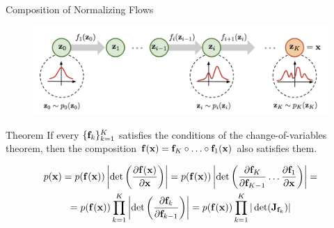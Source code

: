 \documentclass{beamer}
\begin{document}
\begin{frame}{Composition of Normalizing Flows}
	\vspace{-0.3cm}
	\begin{figure}
		\includegraphics[width=0.95\linewidth]{figs/normalizing-flow}
	\end{figure}
	\vspace{-0.3cm}
	\begin{block}{Theorem}
		If every $\{\mathbf{f}_k\}_{k=1}^K$ satisfies the conditions of the change-of-variables theorem, then the composition $\mathbf{f}(\mathbf{x}) = \mathbf{f}_K \circ \ldots \circ \mathbf{f}_1(\mathbf{x})$ also satisfies them.
	\end{block}
	\vspace{-0.3cm}
	{\footnotesize
		\begin{multline*}
			p(\mathbf{x}) = p(\mathbf{f}(\mathbf{x})) \left|\det \left(\frac{\partial \mathbf{f}(\mathbf{x})}{\partial \mathbf{x}} \right) \right| =
			p(\mathbf{f}(\mathbf{x})) \left|\det \left(\frac{\partial \mathbf{f}_K}{\partial \mathbf{f}_{K-1}} \dots \frac{\partial \mathbf{f}_1}{\partial \mathbf{x}} \right) \right| = \\ = p(\mathbf{f}(\mathbf{x})) \prod_{k=1}^K \left|\det \left(\frac{\partial \mathbf{f}_{k}}{\partial \mathbf{f}_{k-1}} \right) \right|
			= p(\mathbf{f}(\mathbf{x})) \prod_{k=1}^K |\det ( \mathbf{J}_{\mathbf{f}_k}) |
		\end{multline*}
	}
\end{frame}
\end{document}
